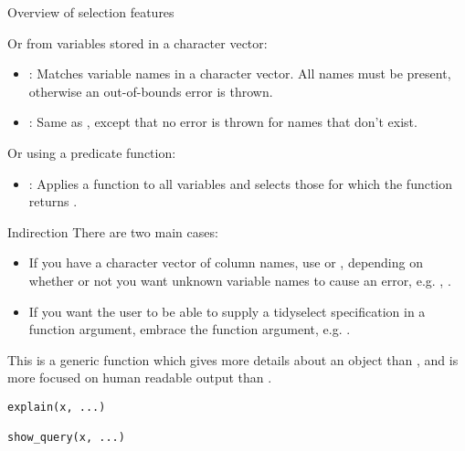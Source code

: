 \documentclass[a4paper]{book}
\begin{document}
\begin{Section}{Overview of selection features}
\begin{itemize}
\end{itemize}


Or from variables stored in a character vector:
\begin{itemize}

\item{} : Matches variable names in a character vector. All
names must be present, otherwise an out-of-bounds error is
thrown.
\item{} : Same as , except that no error is thrown
for names that don't exist.

\end{itemize}


Or using a predicate function:
\begin{itemize}

\item{} : Applies a function to all variables and selects those
for which the function returns .

\end{itemize}

\end{Section}
%
\begin{Section}{Indirection}
There are two main cases:
\begin{itemize}

\item{} If you have a character vector of column names, use 
or , depending on whether or not you want unknown variable
names to cause an error, e.g. ,
.
\item{} If you want the user to be able to supply a tidyselect specification in
a function argument, embrace the function argument, e.g.
.

\end{itemize}

\end{Section}
%
\begin{Description}
This is a generic function which gives more details about an object than
, and is more focused on human readable output than
.
\end{Description}
%
\begin{Usage}
\begin{verbatim}
explain(x, ...)

show_query(x, ...)
\end{verbatim}
\end{Usage}
\end{document}
